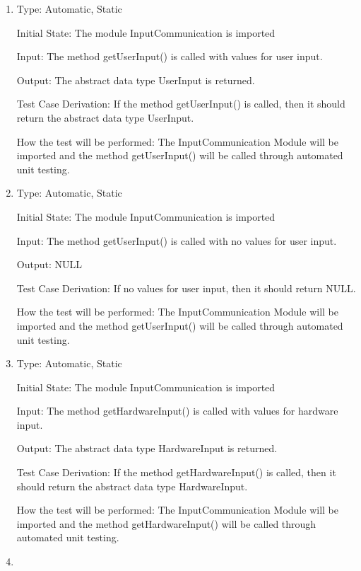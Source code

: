 \documentclass[12pt, titlepage]{article}
\begin{document}
\begin{enumerate}[{UT-IC}1.]

\item

Type: Automatic, Static
					
Initial State: The module InputCommunication is imported
					
Input: The method getUserInput() is called with values for user input.
					
Output: The abstract data type UserInput is returned.

Test Case Derivation: If the method getUserInput() is called, then it should return the abstract data type UserInput.

How the test will be performed: The InputCommunication Module will be imported and the method getUserInput() will be called through automated unit testing.

\item

Type: Automatic, Static
					
Initial State: The module InputCommunication is imported
					
Input: The method getUserInput() is called with no values for user input.
					
Output: NULL

Test Case Derivation: If no values for user input, then it should return NULL.

How the test will be performed: The InputCommunication Module will be imported and the method getUserInput() will be called through automated unit testing.

\item

Type: Automatic, Static
					
Initial State: The module InputCommunication is imported
					
Input: The method getHardwareInput() is called with values for hardware input.
					
Output: The abstract data type HardwareInput is returned.

Test Case Derivation: If the method getHardwareInput() is called, then it should return the abstract data type HardwareInput.

How the test will be performed: The InputCommunication Module will be imported and the method getHardwareInput() will be called through automated unit testing.

\item


\end{enumerate}
\end{document}
